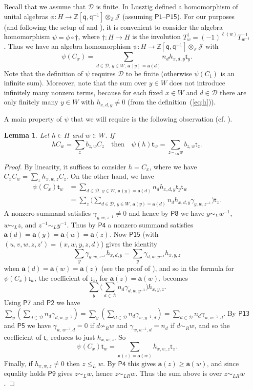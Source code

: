 \documentclass[11pt]{article}
\theoremstyle{plain}
\newtheorem{lemma}[thm]{Lemma}
\theoremstyle{definition}
\numberwithin{equation}{section}
\def\cD{\mathcal{D}}
\def\cJ{\mathcal{J}}
\def\ZZ{\mathbb{Z}}
\newcommand{\st}{\mathsf{t}}
\newcommand{\ba}{\mathbf{a}}
\newcommand{\sq}{\mathsf{q}}
\begin{document}
Recall that we assume that $\cD$ is finite. In \cite[Theorem~18.9]{Lus:03} Lusztig defined a homomorphism of unital algebras $\phi:H\to\ZZ[\sq,\sq^{-1}]\otimes_{\ZZ}\cJ$ (assuming $\mathsf{P1}$--$\mathsf{P15}$). For our purposes (and following the setup of \cite{RW:24} and \cite[Chapter~19]{Bon:17}), it is convenient to consider the algebra homomorphism $\psi=\phi\circ\dagger$, where $\dagger:H\to H$ is the involution $T_w^{\dagger}=(-1)^{\ell(w)}T_{w^{-1}}^{-1}$. Thus we have an algebra homomorphism $
\psi:H\to \ZZ[\sq,\sq^{-1}]\otimes_{\ZZ}\cJ$ with
$$
\psi(C_x)=\sum_{d\in\cD,\,y\in W,\,\ba(y)=\ba(d)}n_dh_{x,d,y}\st_y.
$$
Note that the definition of $\psi$ requires $\cD$ to be finite (otherwise $\psi(C_1)$ is an infinite sum). Moreover, note that the sum over $y\in W$ does not introduce infinitely many nonzero terms, because for each fixed $x\in W$ and $d\in\cD$ there are only finitely many $y\in W$ with $h_{x,d,y}\neq 0$ (from the definition~(\ref{eq:h})). 


A main property of $\psi$ that we will require is the following observation (cf. \cite[Theorem~5.2]{Geck:09}). 

\begin{lemma}\label{lem:51}
Let $h\in H$ and $w\in W$. If
$$
hC_w=\sum_z b_{z,w}C_z\quad\text{then}\quad 
\psi(h)\st_w=\sum_{z\sim_{LR}w}b_{z,w}\st_z.
$$
\end{lemma}

\begin{proof}
By linearity, it suffices to consider $h=C_x$, where we have $C_xC_w=\sum_zh_{x,w,z}C_z$. On the other hand, we have
\begin{align*}
\psi(C_x)\st_w&=\sum_{d\in\cD,\,y\in W,\,\ba(y)=\ba(d)}n_dh_{x,d,y}\st_y\st_w\\
&=\sum_z\bigg(\sum_{d\in\cD,\,y\in W,\,\ba(y)=\ba(d)}n_dh_{x,d,y}\gamma_{y,w,z^{-1}}\bigg)\st_z. 
\end{align*}
A nonzero summand satisfies $\gamma_{y,w,z^{-1}}\neq 0$ and hence by $\mathsf{P8}$ we have $y\sim_L w^{-1}$, $w\sim_L z$, and $z^{-1}\sim_L y^{-1}$. Thus by $\mathsf{P4}$ a nonzero summand satisfies $\ba(d)=\ba(y)=\ba(w)=\ba(z)$. Now $\mathsf{P15}$ (with $(u,v,w,z,z')=(x,w,y,z,d)$) gives the identity 
$$
\sum_y \gamma_{y,w,z^{-1}}h_{x,d,y}=\sum_y\gamma_{d,w,y^{-1}}h_{x,y,z}
$$
when $\ba(d)=\ba(w)=\ba(z)$ (see the proof of \cite[Theorem~18.9]{Lus:03}), and so in the formula for $\psi(C_x)\st_w$, the coefficient of $\st_z$, for $\ba(z)=\ba(w)$, becomes
$$
\sum_y\bigg(\sum_{d\in\cD}n_d\gamma_{d,w,y^{-1}}\bigg)h_{x,y,z}. 
$$
Using $\mathsf{P7}$ and $\mathsf{P2}$ we have $\sum_y\left(\sum_{d\in\cD}n_d\gamma_{d,w,y^{-1}}\right)=\sum_y\left(\sum_{d\in\cD}n_d\gamma_{w,y^{-1},d}\right)=\sum_{d\in\cD}n_d\gamma_{w,w^{-1},d}$. By $\mathsf{P13}$ and $\mathsf{P5}$ we have $\gamma_{w,w^{-1},d}=0$ if $d\not\sim_R w$ and $\gamma_{w,w^{-1},d}=n_d$ if $d\sim_R w$, and so the coefficient of $\st_z$ reduces to just $h_{x,w,z}$. So 
$$
\psi(C_x)\st_w=\sum_{\ba(z)=\ba(w)}h_{x,w,z}\st_z. 
$$
Finally, if $h_{x,w,z}\neq 0$ then $z\leq_L w$. By $\mathsf{P4}$ this gives $\ba(z)\geq \ba(w)$, and since equality holds $\mathsf{P9}$ gives $z\sim_L w$, hence $z\sim_{LR}w$. Thus the sum above is over $z\sim_{LR}w$. 
\end{proof}
\end{document}
